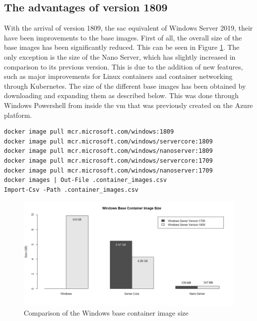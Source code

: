 \subsection{The advantages of version 1809}
With the arrival of version 1809, the \acrfull{sac} equivalent of Windows Server 2019, their have been improvements to the base images. First of all, the overall size of the base images has been significantly reduced. This can be seen in Figure \ref{fig:Containers}. The only exception is the size of the Nano Server, which has slightly increased in comparison to its previous version. This is due to the addition of new features, such as major improvements for Linux containers and container networking through Kubernetes.
The size of the different base images has been obtained by downloading and expanding them as described below. This was done through Windows Powershell from inside the \acrshort{vm} that was previously created on the Azure platform. 

\begin{lstlisting}[breaklines]
docker image pull mcr.microsoft.com/windows:1809
docker image pull mcr.microsoft.com/windows/servercore:1809
docker image pull mcr.microsoft.com/windows/nanoserver:1809  
docker image pull mcr.microsoft.com/windows/servercore:1709 
docker image pull mcr.microsoft.com/windows/nanoserver:1709   
docker images | Out-File .container_images.csv
Import-Csv -Path .container_images.csv
\end{lstlisting}

\begin{figure}[h]
	\captionsetup{width=0.8\linewidth}
	\includegraphics[width=0.9\linewidth]{img/Methodologie/Containers0.png}
	\centering
	\caption[Image size comparison]{Comparison of the Windows base container image size}
	\label{fig:Containers}	
\end{figure}

